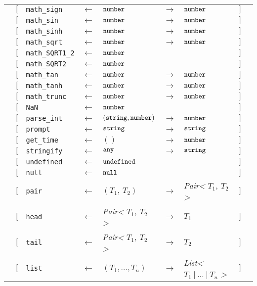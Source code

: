 \begin{tabular}[fragile]{lllllllll}
& $[$ & \texttt{math\_sign} & $\leftarrow$  & $\texttt{number}$ & $\rightarrow$ & $\texttt{number}$ & $]$ \\
& $[$ & \texttt{math\_sin} & $\leftarrow$  & $\texttt{number}$ & $\rightarrow$ & $\texttt{number}$ & $]$ \\
& $[$ & \texttt{math\_sinh} & $\leftarrow$  & $\texttt{number}$ & $\rightarrow$ & $\texttt{number}$ & $]$ \\
& $[$ & \texttt{math\_sqrt} & $\leftarrow$  & $\texttt{number}$ & $\rightarrow$ & $\texttt{number}$ & $]$ \\
& $[$ & \texttt{math\_SQRT1\_2} & $\leftarrow$  & $\texttt{number}$ & & & $]$ \\
& $[$ & \texttt{math\_SQRT2} & $\leftarrow$  & $\texttt{number}$ & & & $]$ \\
& $[$ & \texttt{math\_tan} & $\leftarrow$  & $\texttt{number}$ & $\rightarrow$ & $\texttt{number}$ & $]$ \\
& $[$ & \texttt{math\_tanh} & $\leftarrow$  & $\texttt{number}$ & $\rightarrow$ & $\texttt{number}$ & $]$ \\
& $[$ & \texttt{math\_trunc} & $\leftarrow$  & $\texttt{number}$ & $\rightarrow$ & $\texttt{number}$ & $]$ \\
& $[$ & \texttt{NaN} & $\leftarrow$  & $\texttt{number}$ & & & $]$ \\
& $[$ & \texttt{parse\_int} & $\leftarrow$  & $(\texttt{string}, \texttt{number})$ & $\rightarrow$ & $\texttt{number}$ & $]$ \\
& $[$ & \texttt{prompt} & $\leftarrow$  & $\texttt{string}$ & $\rightarrow$ & $\texttt{string}$ & $]$ \\
& $[$ & \texttt{get\_time} & $\leftarrow$  & $()$ & $\rightarrow$ & $\texttt{number}$ & $]$ \\
& $[$ & \texttt{stringify} & $\leftarrow$  & $\texttt{any}$ & $\rightarrow$ & $\texttt{string}$ & $]$ \\
& $[$ & \texttt{undefined} & $\leftarrow$  & $\texttt{undefined}$ & & & $]$ \\
& $[$ & \texttt{null}      & $\leftarrow$  & $\texttt{null}$ & & & $]$ \\
& $[$ & \texttt{pair} & $\leftarrow$  & $(T_1,\ T_2)$ & $\rightarrow$ & \textit{Pair<} $T_1,\ T_2$ \textit{>} & $]$ \\
& $[$ & \texttt{head} & $\leftarrow$  & \textit{Pair<} $T_1,\ T_2$ \textit{>} & $\rightarrow$ & $T_1$ & $]$ \\
& $[$ & \texttt{tail} & $\leftarrow$  & \textit{Pair<} $T_1,\ T_2$ \textit{>} & $\rightarrow$ & $T_2$ & $]$ \\
& $[$ & \texttt{list} & $\leftarrow$  & $(T_1, \ldots, T_n)$ & $\rightarrow$ & \textit{List<} $T_1\ |\ \ldots\ |\ T_n$ \textit{>} & $]$ \\

\end{tabular}
